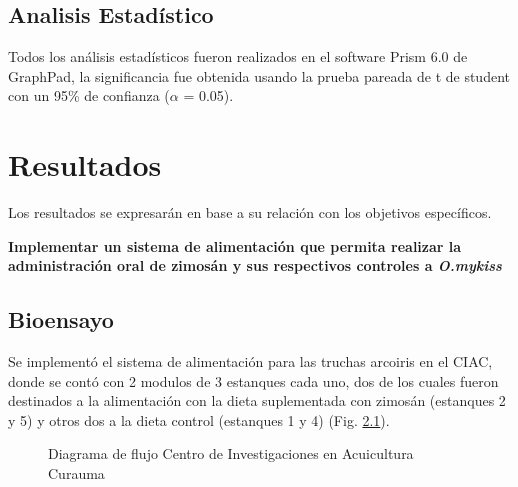\documentclass[12pt,a4paper,oneside]{scrbook}
\begin{document}
\section{Analisis Estadístico}

Todos los análisis estadísticos fueron realizados en el software Prism
6.0 de GraphPad, la significancia fue obtenida usando la prueba pareada
de t de student con un 95\% de confianza ($\alpha$ = 0.05).

\chapter{Resultados}\label{resultados}

Los resultados se expresarán en base a su relación con los objetivos
específicos.

\textbf{Implementar un sistema de alimentación que permita realizar la administración oral de zimosán y sus respectivos controles a \emph{O.mykiss}}

\section{Bioensayo}\label{bioensayo}

Se implementó el sistema de alimentación para las truchas arcoiris en el
CIAC, donde se contó con 2 modulos de 3 estanques cada uno, dos de los
cuales fueron destinados a la alimentación con la dieta suplementada con
zimosán (estanques 2 y 5) y otros dos a la dieta control (estanques 1 y
4) (Fig. \ref{fig:ciac}).

\begin{figure}[h!]
    \centering
    \caption {Diagrama de flujo Centro de Investigaciones en Acuicultura Curauma}
    \label {fig:ciac}
\end{figure}
\end{document}
